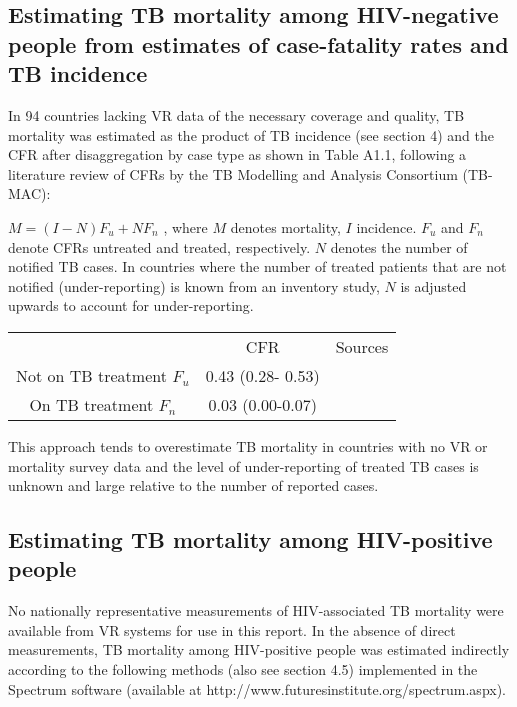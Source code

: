 \subsection{Estimating TB mortality among HIV-negative people from estimates of case-fatality rates and TB incidence
}

In 94 countries lacking VR data of the necessary coverage and quality, TB mortality was estimated as the product of TB incidence (see section 4) and the CFR after disaggregation by case type as shown in Table A1.1, following a literature review of CFRs by the TB Modelling and Analysis Consortium (TB-MAC):

$M = (I-N)F_u + NF_n$ , where $M$ denotes mortality, $I$ incidence. $F_u$ and $F_n$ denote CFRs untreated and treated, respectively. $N$ denotes the number of notified TB cases. In countries where the number of treated patients that are not notified (under-reporting) is known from an inventory study, $N$ is adjusted upwards to account for under-reporting. 

\begin{table} 
    \begin{tabular}{ c c c }
         & CFR & Sources \\ 
        Not on TB treatment $F_u$ & 0.43 (0.28- 0.53) &  \cite{12742798} \cite{21483732} \\ 
        On TB treatment $F_n$ & 0.03 (0.00-0.07) &  \cite{21738585} \\ 
    \end{tabular} 
\end{table}

This approach tends to overestimate TB mortality in countries with no VR or mortality survey data and the level of under-reporting of treated TB cases is unknown and large relative to the number of reported cases. 


\subsection{Estimating TB mortality among HIV-positive people}

No nationally representative measurements of HIV-associated TB mortality were available from VR systems for use in this report. In the absence of direct measurements, TB mortality among HIV-positive people was estimated indirectly according to the following methods (also see section 4.5) implemented in the Spectrum software (available at http://www.futuresinstitute.org/spectrum.aspx).

